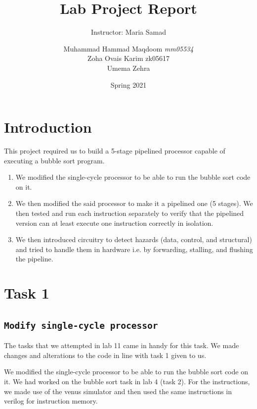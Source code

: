 \documentclass[a4paper, 12pt]{report}
\institute{Habib University}
\title{Lab Project Report}
\subtitle{Instructor: Maria Samad}
\author{Muhammad Hammad Maqdoom \textit{mm05534} \\ Zoha Ovais Karim zk05617 \\ Umema Zehra}
\date{Spring 2021}
\begin{document}
    \maketitle
    \romantableofcontents
    \chapter{Introduction}
    
    This project required us to build a 5-stage pipelined processor capable of executing a bubble sort program.
    
    \begin{enumerate}
        \item We modified the single-cycle processor to be able to run the bubble sort code on it.
        \item We then modified the said processor to make it a pipelined one (5 stages). We then tested and run each instruction separately to verify that the pipelined version can at least execute one instruction correctly in isolation.
        \item We then introduced circuitry to detect hazards (data, control, and structural) and tried to handle them in hardware i.e. by forwarding, stalling, and flushing the pipeline.

    \end{enumerate}
    
    
    \chapter{Task 1}
    \section{\texttt{Modify single-cycle processor}}
    The tasks that we attempted in lab 11 came in handy for this task. We made changes and alterations to the code in line with task 1 given to us. 
    
    We modified the single-cycle processor to be able to run the bubble sort code on it.
    We had worked on the bubble sort task in lab 4 (task 2). 
    For the instructions, we made use of the venus simulator and then used the same instructions in verilog for instruction memory. 
\end{document}
